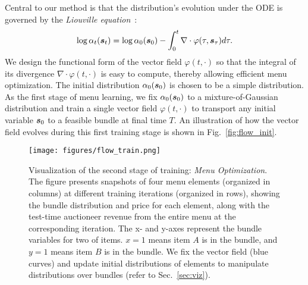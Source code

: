 Central to our method is that the distribution's evolution under the ODE
is governed by the {\em Liouville equation}~\cite{liouville1838note}:
%
\begin{align}
    \log \alpha_t({\bm{s}}_t) = \log \alpha_0({\bm{s}}_0) -\int_0^t \nabla\cdot\varphi(\tau, {\bm{s}}_\tau) d\tau.\label{equ:demo_liouville}
\end{align}
We design the functional form of the vector field $\varphi(t, \cdot)$ so that the integral of its divergence $\nabla\cdot\varphi(t, \cdot)$ is easy to compute, thereby allowing efficient menu optimization. The initial distribution $\alpha_0({\bm{s}}_0)$ is chosen to be a simple distribution. As the first stage of menu learning, we fix $\alpha_0({\bm{s}}_0)$ to a mixture-of-Gaussian distribution 
and train a single vector field $\varphi(t, \cdot)$ to transport any initial variable ${\bm{s}}_0$ to a feasible bundle at final time $T$. An illustration of how the vector field evolves during this first training stage is shown in Fig.~\ref{fig:flow_init}.

\begin{figure}
    \centering
    \texttt{[image: figures/flow\_train.png]}
    \caption{Visualization of the second stage of training: \emph{Menu Optimization}. The figure presents snapshots of four menu elements (organized in columns) at different training iterations (organized in rows), showing the bundle distribution and price for each element, along with the test-time auctioneer revenue from the entire menu at the corresponding iteration. The x- and y-axes represent the bundle variables for two of items. $x=1$ means item $A$ is in the bundle, and $y=1$ means item $B$ is in the bundle. We fix the vector field (blue curves) and update initial distributions of elements to manipulate distributions over bundles (refer to Sec.~\ref{sec:viz}).%
    \label{fig:flow_train}}
\end{figure}


